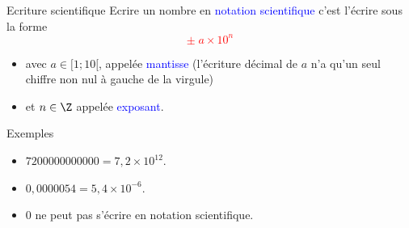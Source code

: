 \documentclass[10pt,french]{beamer}
\begin{document}
\begin{frame}{\Ctitle}{\stitle}
	\begin{block}{\textcolor{yellow}{\small \rappel} Ecriture scientifique}
		Ecrire un nombre en \textcolor{blue}{notation scientifique} c'est l'écrire sous la forme
		\onslide<2->\textcolor{red}{$$\boxed{\pm \; a \times 10^n}$$} \vspace{-0.5cm}
		\begin{itemize}
			\item<3-> avec $a \in [1;10[$, appelée \textcolor{blue}{mantisse} (l'écriture  décimal de $a$ n'a qu'un seul chiffre non nul à gauche de la virgule)
			\item<4-> et $n \in \Z$ appelée \textcolor{blue}{exposant}.
		\end{itemize}
	\end{block}
	\begin{exampleblock}{Exemples}
		\begin{itemize}
			\item<5-> $7200000000000 = 7,2 \times 10^{12}$.
			\item<6-> $0,0000054 = 5,4 \times 10^{-6}$.
			\item<7-> 0 ne peut pas s'écrire en notation scientifique.
		\end{itemize}
	\end{exampleblock}
\end{frame}
\end{document}
